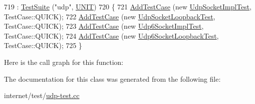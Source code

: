 \begin{DoxyCode}
719                   : \hyperlink{classns3_1_1TestSuite_a904b0c40583b744d30908aeb94636d1a}{TestSuite} (\textcolor{stringliteral}{"udp"}, \hyperlink{classns3_1_1TestSuite_a1ebfcab34ec8161e085e8e3a1855eae0a3885375a3787abf60431f8454b3cadbd}{UNIT})
720   \{
721     \hyperlink{classns3_1_1TestCase_a3718088e3eefd5d6454569d2e0ddd835}{AddTestCase} (\textcolor{keyword}{new} \hyperlink{classUdpSocketImplTest}{UdpSocketImplTest}, TestCase::QUICK);
722     \hyperlink{classns3_1_1TestCase_a3718088e3eefd5d6454569d2e0ddd835}{AddTestCase} (\textcolor{keyword}{new} \hyperlink{classUdpSocketLoopbackTest}{UdpSocketLoopbackTest}, TestCase::QUICK);
723     \hyperlink{classns3_1_1TestCase_a3718088e3eefd5d6454569d2e0ddd835}{AddTestCase} (\textcolor{keyword}{new} \hyperlink{classUdp6SocketImplTest}{Udp6SocketImplTest}, TestCase::QUICK);
724     \hyperlink{classns3_1_1TestCase_a3718088e3eefd5d6454569d2e0ddd835}{AddTestCase} (\textcolor{keyword}{new} \hyperlink{classUdp6SocketLoopbackTest}{Udp6SocketLoopbackTest}, TestCase::QUICK);
725   \}
\end{DoxyCode}


Here is the call graph for this function\+:




The documentation for this class was generated from the following file\+:\begin{DoxyCompactItemize}
\item 
internet/test/\hyperlink{udp-test_8cc}{udp-\/test.\+cc}\end{DoxyCompactItemize}
